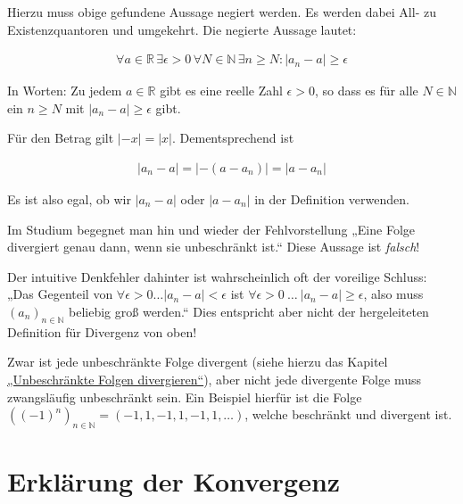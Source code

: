 \documentclass[fontsize=9pt,
               parskip=half-,
               DIV=14,
               listof=chapterentry,
               tocflat]{scrbook}
\begin{document}
\begin{answer*}
Hierzu muss obige gefundene Aussage negiert werden.  Es werden dabei All- zu Existenzquantoren und umgekehrt. Die negierte Aussage lautet:

\begin{align*}
\forall a\in \mathbb {R} \,\exists \epsilon >0\,\forall N\in \mathbb {N} \,\exists n\geq N:|a_{n}-a|\geq \epsilon 
\end{align*}

In Worten: Zu jedem $a\in \mathbb {R} $ gibt es eine reelle Zahl $\epsilon >0$, so dass es für alle $N\in \mathbb {N} $ ein $n\geq N$ mit $|a_{n}-a|\geq \epsilon $ gibt.

\end{answer*}

\begin{hint*}
Für den Betrag gilt $|-x|=|x|$. Dementsprechend ist

\begin{align*}
|a_{n}-a|=|-(a-a_{n})|=|a-a_{n}|
\end{align*}

Es ist also egal, ob wir $|a_{n}-a|$ oder $|a-a_{n}|$ in der Definition verwenden.

\end{hint*}

\begin{warning*}
Im Studium begegnet man hin und wieder der Fehlvorstellung „Eine Folge divergiert genau dann, wenn sie unbeschränkt ist.“ Diese Aussage ist \emph{falsch}!

Der intuitive Denkfehler dahinter ist wahrscheinlich oft der voreilige Schluss: „Das Gegenteil von $\forall \epsilon >0\ldots |a_{n}-a|<\epsilon $ ist $\forall \epsilon >0\ \ldots \ |a_{n}-a|\geq \epsilon $, also muss $(a_{n})_{n\in \mathbb {N} }$ beliebig groß werden.“ Dies entspricht aber nicht der hergeleiteten Definition für Divergenz von oben!

Zwar ist jede unbeschränkte Folge divergent (siehe hierzu das Kapitel \href{https://de.wikibooks.org/wiki/Mathe\_für\_Nicht-Freaks:\_Unbeschränkte\_Folgen\_divergieren}
{„Unbeschränkte Folgen divergieren“}), aber nicht jede divergente Folge muss zwangsläufig unbeschränkt sein. Ein Beispiel hierfür ist die Folge $\left((-1)^{n}\right)_{n\in \mathbb {N} }=(-1,1,-1,1,-1,1,\ldots )$, welche beschränkt und divergent ist.

\end{warning*}

\section{Erklärung der Konvergenz}
\end{document}
